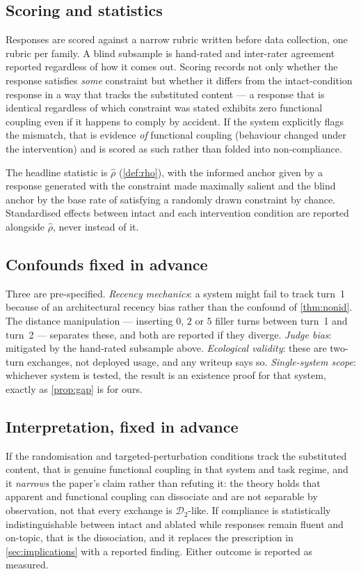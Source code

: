 \documentclass[11pt,a4paper]{article}
\theoremstyle{plain}
\theoremstyle{definition}
\theoremstyle{remark}
\newcommand{\Dy}{\mathcal{D}}
\begin{document}
\begin{appendices}
\subsection{Scoring and statistics}

Responses are scored against a narrow rubric written before data collection, one rubric per family. A blind
subsample is hand-rated and inter-rater agreement reported regardless of how it comes out. Scoring records not
only whether the response satisfies \emph{some} constraint but whether it differs from the intact-condition
response in a way that tracks the substituted content --- a response that is identical regardless of which
constraint was stated exhibits zero functional coupling even if it happens to comply by accident. If the system
explicitly flags the mismatch, that is evidence \emph{of} functional coupling (behaviour changed under the
intervention) and is scored as such rather than folded into non-compliance.

The headline statistic is $\hat{\rho}$ (\cref{def:rho}), with the informed anchor given by a response generated
with the constraint made maximally salient and the blind anchor by the base rate of satisfying a randomly drawn
constraint by chance. Standardised effects between intact and each intervention condition are reported alongside
$\hat{\rho}$, never instead of it.

\subsection{Confounds fixed in advance}

Three are pre-specified. \emph{Recency mechanics}: a system might fail to track turn~1 because of an
architectural recency bias rather than the confound of \cref{thm:nonid}. The distance manipulation --- inserting
$0$, $2$ or $5$ filler turns between turn~1 and turn~2 --- separates these, and both are reported if they
diverge. \emph{Judge bias}: mitigated by the hand-rated subsample above. \emph{Ecological validity}: these are
two-turn exchanges, not deployed usage, and any writeup says so. \emph{Single-system scope}: whichever system is
tested, the result is an existence proof for that system, exactly as \cref{prop:gap} is for ours.

\subsection{Interpretation, fixed in advance}

If the randomisation and targeted-perturbation conditions track the substituted content, that is genuine
functional coupling in that system and task regime, and it \emph{narrows} the paper's claim rather than
refuting it: the theory holds that apparent and functional coupling can dissociate and are not separable by
observation, not that every exchange is $\Dy_2$-like. If compliance is statistically indistinguishable between
intact and ablated while responses remain fluent and on-topic, that is the dissociation, and it replaces the
prescription in \cref{sec:implications} with a reported finding. Either outcome is reported as measured.

\end{appendices}
\end{document}
